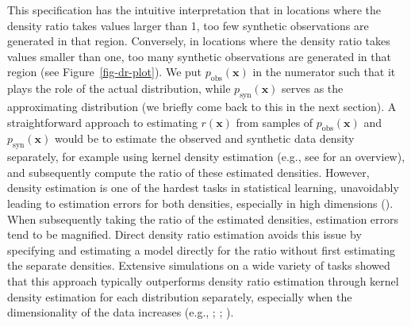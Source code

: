 \documentclass[
]{article}
\newcommand{\pobs}{p_{\text{obs}}}
\newcommand{\psyn}{p_{\text{syn}}}
\newcommand{\bx}{\mathbf{x}}
\begin{document}
This specification has the intuitive interpretation that in locations
where the density ratio takes values larger than 1, too few synthetic
observations are generated in that region. Conversely, in locations
where the density ratio takes values smaller than one, too many
synthetic observations are generated in that region (see
Figure~\ref{fig-dr-plot}). We put \(\pobs(\bx)\) in the numerator such
that it plays the role of the actual distribution, while \(\psyn(\bx)\)
serves as the approximating distribution (we briefly come back to this
in the next section). A straightforward approach to estimating
\(r(\bx)\) from samples of \(\pobs(\bx)\) and \(\psyn(\bx)\) would be to
estimate the observed and synthetic data density separately, for example
using kernel density estimation (e.g., see
 for an overview), and subsequently
compute the ratio of these estimated densities. However, density
estimation is one of the hardest tasks in statistical learning,
unavoidably leading to estimation errors for both densities, especially
in high dimensions
(). When subsequently taking the ratio of the estimated
densities, estimation errors tend to be magnified. Direct density ratio
estimation avoids this issue by specifying and estimating a model
directly for the ratio without first estimating the separate densities.
Extensive simulations on a wide variety of tasks showed that this
approach typically outperforms density ratio estimation through kernel
density estimation for each distribution separately, especially when the
dimensionality of the data increases (e.g.,
;
;
).

\linespread{1}
\end{document}
